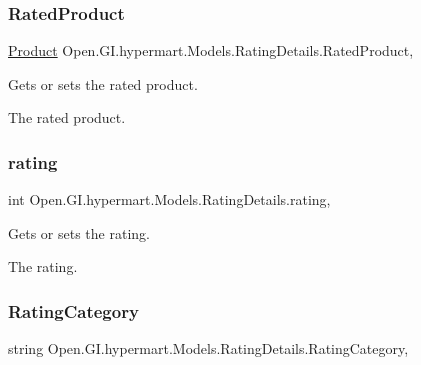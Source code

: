 \subsubsection{\texorpdfstring{Rated\+Product}{RatedProduct}}
{\footnotesize\ttfamily \hyperlink{class_open_1_1_g_i_1_1hypermart_1_1_models_1_1_product}{Product} Open.\+G\+I.\+hypermart.\+Models.\+Rating\+Details.\+Rated\+Product\hspace{0.3cm}{\ttfamily [get]}, {\ttfamily [set]}}



Gets or sets the rated product. 

The rated product. \hypertarget{class_open_1_1_g_i_1_1hypermart_1_1_models_1_1_rating_details_a4ebc3ade419dafcd0571436f6b6363b8}{}\label{class_open_1_1_g_i_1_1hypermart_1_1_models_1_1_rating_details_a4ebc3ade419dafcd0571436f6b6363b8} 
\subsubsection{\texorpdfstring{rating}{rating}}
{\footnotesize\ttfamily int Open.\+G\+I.\+hypermart.\+Models.\+Rating\+Details.\+rating\hspace{0.3cm}{\ttfamily [get]}, {\ttfamily [set]}}



Gets or sets the rating. 

The rating. \hypertarget{class_open_1_1_g_i_1_1hypermart_1_1_models_1_1_rating_details_a3c293c7912e7c60b75128586706db64a}{}\label{class_open_1_1_g_i_1_1hypermart_1_1_models_1_1_rating_details_a3c293c7912e7c60b75128586706db64a} 
\subsubsection{\texorpdfstring{Rating\+Category}{RatingCategory}}
{\footnotesize\ttfamily string Open.\+G\+I.\+hypermart.\+Models.\+Rating\+Details.\+Rating\+Category\hspace{0.3cm}{\ttfamily [get]}, {\ttfamily [set]}}



